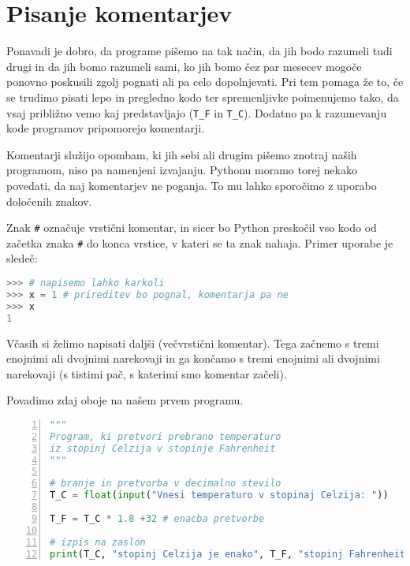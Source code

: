 \section{Pisanje komentarjev}
Ponavadi je dobro, da programe pišemo na tak način, da jih bodo razumeli tudi drugi in da jih bomo razumeli sami, ko jih bomo čez par mesecev mogoče ponovno poskusili zgolj pognati ali pa celo dopolnjevati. Pri tem pomaga že to, če se trudimo pisati lepo in pregledno kodo ter spremenljivke poimenujemo tako, da vsaj približno vemo kaj predstavljajo (\texttt{T\_F} in \texttt{T\_C}). Dodatno pa k razumevanju kode programov pripomorejo komentarji.

Komentarji služijo opombam, ki jih sebi ali drugim pišemo znotraj naših programom, niso pa namenjeni izvajanju. Pythonu moramo torej nekako povedati, da naj komentarjev ne poganja. To mu lahko sporočimo z uporabo določenih znakov. 

Znak \texttt{\#} označuje vrstični komentar, in sicer bo Python preskočil vso kodo od začetka znaka \texttt{\#} do konca vrstice, v kateri se ta znak nahaja. Primer uporabe je sledeč:
\begin{lstlisting}[language=Python]
>>> # napisemo lahko karkoli
>>> x = 1 # prireditev bo pognal, komentarja pa ne
>>> x
1
\end{lstlisting}

Včasih si želimo napisati daljši (večvrstični komentar). Tega začnemo s tremi enojnimi ali dvojnimi narekovaji in ga končamo s tremi enojnimi ali dvojnimi narekovaji (s tistimi pač, s katerimi smo komentar začeli).

Povadimo zdaj oboje na našem prvem programu.
\begin{lstlisting}[language=Python,numbers=left]
"""
Program, ki pretvori prebrano temperaturo 
iz stopinj Celzija v stopinje Fahrenheit
"""

# branje in pretvorba v decimalno stevilo
T_C = float(input("Vnesi temperaturo v stopinaj Celzija: ")) 

T_F = T_C * 1.8 +32 # enacba pretvorbe

# izpis na zaslon
print(T_C, "stopinj Celzija je enako", T_F, "stopinj Fahrenheit.") 
\end{lstlisting}



